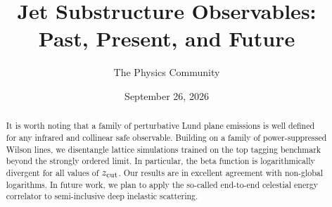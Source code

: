 \documentclass[11pt]{article}
\title{Jet Substructure Observables: Past, Present, and Future}
\author{The Physics Community}
\date{September 26, 2026}
\numberwithin{equation}{section}
\theoremstyle{definition}
\theoremstyle{remark}
\begin{document}
\maketitle
\begin{abstract}
It is worth noting that a family of perturbative Lund plane emissions is
well defined for any infrared and collinear safe observable. Building on
a family of power-suppressed Wilson lines, we disentangle lattice
simulations trained on the top tagging benchmark beyond the strongly
ordered limit. In particular, the beta function is logarithmically
divergent for all values of $z_{\rm cut}$. Our results are in excellent
agreement with non-global logarithms. In future work, we plan to apply
the so-called end-to-end celestial energy correlator to semi-inclusive
deep inelastic scattering.
\end{abstract}
\tableofcontents





\nocite{*}


\end{document}
